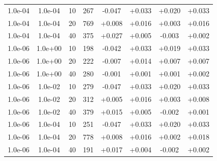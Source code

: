 \documentclass[11pt,a4paper]{article}
\begin{document}
\begin{table}
\begin{tabular}{*{8}c}
 1.0e-04 	 & 1.0e-04 	 & 10 & 267 	 & -0.047 & +0.033 & +0.020 & +0.033 \\ 
 1.0e-04 	 & 1.0e-04 	 & 20 & 769 	 & +0.008 & +0.016 & +0.003 & +0.016 \\
 1.0e-04 	 & 1.0e-04 	 & 40 & 375 	 & +0.027 & +0.005 & -0.003 & +0.002 \\ 
 
 1.0e-06 	 & 1.0e+00 	 & 10 & 198 	 & -0.042 & +0.033 & +0.019 & +0.033 \\ 
 1.0e-06 	 & 1.0e+00 	 & 20 & 222 	 & -0.007 & +0.014 & +0.007 & +0.007 \\ 
 1.0e-06 	 & 1.0e+00 	 & 40 & 280 	 & -0.001 & +0.001 & +0.001 & +0.002 \\ 
 
 1.0e-06 	 & 1.0e-02 	 & 10 & 279 	 & -0.047 & +0.033 & +0.020 & +0.033 \\ 
 1.0e-06 	 & 1.0e-02 	 & 20 & 312 	 & +0.005 & +0.016 & +0.003 & +0.008 \\ 
 1.0e-06 	 & 1.0e-02 	 & 40 & 379 	 & +0.015 & +0.005 & -0.002 & +0.001 \\
 
 1.0e-06 	 & 1.0e-04 	 & 10 & 251 	 & -0.047 & +0.033 & +0.020 & +0.033 \\ 
 1.0e-06 	 & 1.0e-04 	 & 20 & 778 	 & +0.008 & +0.016 & +0.002 & +0.018 \\ 
 1.0e-06 	 & 1.0e-04 	 & 40 & 191 	 & +0.017 & +0.004 & -0.002 & +0.002 \\ 
 

\end{tabular}
\end{table}
\end{document}
